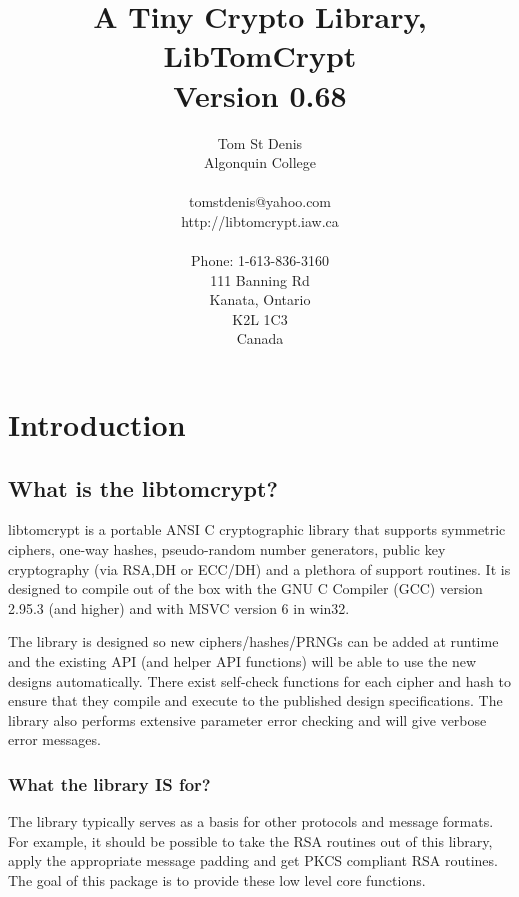 \documentclass{book}
\begin{document}
\title{A Tiny Crypto Library, \\ LibTomCrypt \\ Version 0.68}
\author{Tom St Denis \\
Algonquin College \\
\\
tomstdenis@yahoo.com \\
http://libtomcrypt.iaw.ca \\ \\
Phone: 1-613-836-3160\\
111 Banning Rd \\
Kanata, Ontario \\
K2L 1C3 \\
Canada 
}
\maketitle
\newpage
\tableofcontents
\chapter{Introduction}
\section{What is the libtomcrypt?}
libtomcrypt is a portable ANSI C cryptographic library that supports
symmetric ciphers, one-way hashes, pseudo-random number generators, public key cryptography (via RSA,DH or ECC/DH) and 
a plethora of support routines.  It is designed to compile out of the box with the GNU C Compiler (GCC) version 
2.95.3 (and higher) and with MSVC version 6 in win32.

The library is designed so new ciphers/hashes/PRNGs can be added at runtime and the existing API (and helper API functions) will 
be able to use the new designs automatically.  There exist self-check functions for each cipher and hash to ensure that
they compile and execute to the published design specifications.  The library also performs extensive parameter error checking
and will give verbose error messages.

\subsection{What the library {\bf IS} for?}

The library typically serves as a basis for other protocols and message formats.  For example, it should be possible to 
take the RSA routines out of this library, apply the appropriate message padding and get PKCS compliant RSA routines.  The
goal of this package is to provide these low level core functions.  
\end{document}
